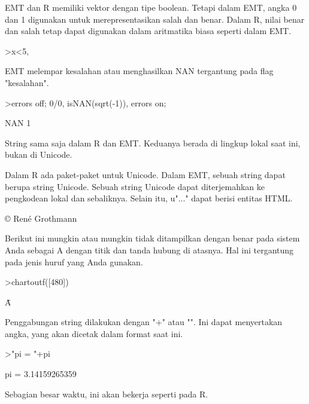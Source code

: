 \documentclass[a4paper,10pt]{article}
\begin{document}
\begin{eulernotebook}
\begin{eulercomment}
\begin{eulercomment}
\begin{eulercomment}
\begin{eulercomment}
\begin{eulercomment}
EMT dan R memiliki vektor dengan tipe boolean. Tetapi dalam EMT, angka
0 dan 1 digunakan untuk merepresentasikan salah dan benar. Dalam R,
nilai benar dan salah tetap dapat digunakan dalam aritmatika biasa
seperti dalam EMT.
\end{eulercomment}
\begin{eulerprompt}
>x<5, %
\end{eulerprompt}
\begin{euleroutput}
  [0,  0,  1,  0,  0]
  [0,  0,  3.1,  0,  0]
\end{euleroutput}
\begin{eulercomment}
EMT melempar kesalahan atau menghasilkan NAN tergantung pada flag
"kesalahan".
\end{eulercomment}
\begin{eulerprompt}
>errors off; 0/0, isNAN(sqrt(-1)), errors on;
\end{eulerprompt}
\begin{euleroutput}
  NAN
  1
\end{euleroutput}
\begin{eulercomment}
String sama saja dalam R dan EMT. Keduanya berada di lingkup lokal
saat ini, bukan di Unicode.

Dalam R ada paket-paket untuk Unicode. Dalam EMT, sebuah string dapat
berupa string Unicode. Sebuah string Unicode dapat diterjemahkan ke
pengkodean lokal dan sebaliknya. Selain itu, u"..." dapat berisi
entitas HTML.
\end{eulercomment}
\begin{euleroutput}
  © René Grothmann
\end{euleroutput}
\begin{eulercomment}
Berikut ini mungkin atau mungkin tidak ditampilkan dengan benar pada
sistem Anda sebagai A dengan titik dan tanda hubung di atasnya. Hal
ini tergantung pada jenis huruf yang Anda gunakan.
\end{eulercomment}
\begin{eulerprompt}
>chartoutf([480])
\end{eulerprompt}
\begin{euleroutput}
  Ǡ
\end{euleroutput}
\begin{eulercomment}
Penggabungan string dilakukan dengan "+" atau "\textbar{}". Ini dapat
menyertakan angka, yang akan dicetak dalam format saat ini.
\end{eulercomment}
\begin{eulerprompt}
>"pi = "+pi
\end{eulerprompt}
\begin{euleroutput}
  pi = 3.14159265359
\end{euleroutput}
\begin{eulercomment}
Sebagian besar waktu, ini akan bekerja seperti pada R.


\end{eulercomment}
\end{eulercomment}
\end{eulercomment}
\end{eulercomment}
\end{eulercomment}
\end{eulernotebook}
\end{document}
